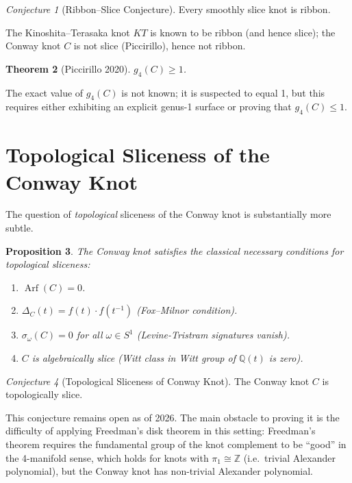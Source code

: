 \documentclass[12pt,a4paper]{amsart}
\newtheorem{theorem}{Theorem}[section]
\newtheorem{proposition}[theorem]{Proposition}
\theoremstyle{definition}
\theoremstyle{remark}
\newtheorem{conjecture}[theorem]{Conjecture}
\DeclareMathOperator{\Arf}{Arf}
\newcommand{\Z}{\mathbb{Z}}
\newcommand{\Q}{\mathbb{Q}}
\begin{document}
\begin{conjecture}[Ribbon--Slice Conjecture]
\label{conj:ribbon-slice}
Every smoothly slice knot is ribbon.
\end{conjecture}

The Kinoshita--Terasaka knot $KT$ is known to be ribbon (and hence slice);
the Conway knot $C$ is not slice (Piccirillo), hence not ribbon.

\begin{theorem}[Piccirillo 2020]
$g_4(C) \geq 1$.
\end{theorem}

The exact value of $g_4(C)$ is not known; it is suspected to equal 1, but
this requires either exhibiting an explicit genus-1 surface or proving that
$g_4(C) \leq 1$.

\section{Topological Sliceness of the Conway Knot}

The question of \emph{topological} sliceness of the Conway knot is
substantially more subtle.

\begin{proposition}
The Conway knot satisfies the classical necessary conditions for topological
sliceness:
\begin{enumerate}[label=\roman*)]
\item $\Arf(C) = 0$.
\item $\Delta_C(t) = f(t) \cdot f(t^{-1})$ (Fox--Milnor condition).
\item $\sigma_\omega(C) = 0$ for all $\omega \in S^1$ (Levine-Tristram signatures vanish).
\item $C$ is algebraically slice (Witt class in Witt group of $\Q(t)$ is zero).
\end{enumerate}
\end{proposition}

\begin{conjecture}[Topological Sliceness of Conway Knot]
\label{conj:Conway-top-slice}
The Conway knot $C$ is topologically slice.
\end{conjecture}

This conjecture remains open as of 2026. The main obstacle to proving it
is the difficulty of applying Freedman's disk theorem in this setting:
Freedman's theorem requires the fundamental group of the knot complement to
be ``good'' in the 4-manifold sense, which holds for knots with
$\pi_1 \cong \Z$ (i.e.\ trivial Alexander polynomial), but the Conway knot
has non-trivial Alexander polynomial.
\end{document}
